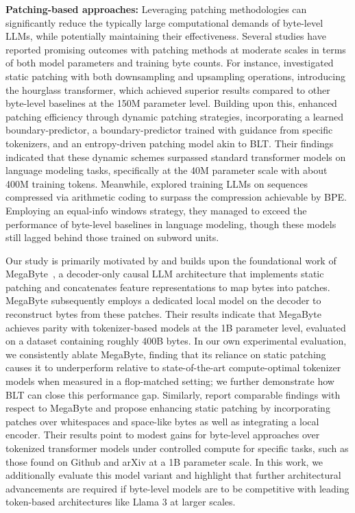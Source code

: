 \textbf{Patching-based approaches:} Leveraging patching methodologies can significantly reduce the typically large computational demands of byte-level LLMs, while potentially maintaining their effectiveness. Several studies have reported promising outcomes with patching methods at moderate scales in terms of both model parameters and training byte counts. For instance, \cite{nawrot-etal-2022-hierarchical} investigated static patching with both downsampling and upsampling operations, introducing the hourglass transformer, which achieved superior results compared to other byte-level baselines at the 150M parameter level. Building upon this, \cite{nawrot-etal-2023-efficient} enhanced patching efficiency through dynamic patching strategies, incorporating a learned boundary-predictor, a boundary-predictor trained with guidance from specific tokenizers, and an entropy-driven patching model akin to {\textsc BLT}. Their findings indicated that these dynamic schemes surpassed standard transformer models on language modeling tasks, specifically at the 40M parameter scale with about 400M training tokens. Meanwhile, \cite{lester2024training} explored training LLMs on sequences compressed via arithmetic coding to surpass the compression achievable by BPE. Employing an equal-info windows strategy, they managed to exceed the performance of byte-level baselines in language modeling, though these models still lagged behind those trained on subword units.

Our study is primarily motivated by and builds upon the foundational work of MegaByte~\citep{yu2023megabyte}, a decoder-only causal LLM architecture that implements static patching and concatenates feature representations to map bytes into patches. MegaByte subsequently employs a dedicated local model on the decoder to reconstruct bytes from these patches. Their results indicate that MegaByte achieves parity with tokenizer-based models at the 1B parameter level, evaluated on a dataset containing roughly 400B bytes. In our own experimental evaluation, we consistently ablate MegaByte, finding that its reliance on static patching causes it to underperform relative to state-of-the-art compute-optimal tokenizer models when measured in a flop-matched setting; we further demonstrate how {\textsc BLT} can close this performance gap. Similarly, \cite{slagle2024spacebyte} report comparable findings with respect to MegaByte and propose enhancing static patching by incorporating patches over whitespaces and space-like bytes as well as integrating a local encoder. Their results point to modest gains for byte-level approaches over tokenized transformer models under controlled compute for specific tasks, such as those found on Github and arXiv at a 1B parameter scale. In this work, we additionally evaluate this model variant and highlight that further architectural advancements are required if byte-level models are to be competitive with leading token-based architectures like Llama 3 at larger scales.

